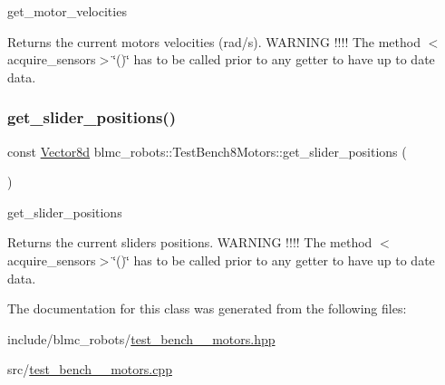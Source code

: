 get\+\_\+motor\+\_\+velocities 

\begin{DoxyReturn}{Returns}
the current motors velocities (rad/s). W\+A\+R\+N\+I\+NG !!!! The method $<$acquire\+\_\+sensors$>$\char`\"{}()\char`\"{} has to be called prior to any getter to have up to date data. 
\end{DoxyReturn}
\mbox{\label{classblmc__robots_1_1TestBench8Motors_a11bdbb6f0e4dd0824075ba309f69ad3a}} 
\subsubsection{\texorpdfstring{get\+\_\+slider\+\_\+positions()}{get\_slider\_positions()}}
{\footnotesize\ttfamily const \hyperlink{common__header_8hpp_a98975ffbe0bca1296078e0350dfedd60}{Vector8d} blmc\+\_\+robots\+::\+Test\+Bench8\+Motors\+::get\+\_\+slider\+\_\+positions (\begin{DoxyParamCaption}{ }\end{DoxyParamCaption})\hspace{0.3cm}{\ttfamily [inline]}}



get\+\_\+slider\+\_\+positions 

\begin{DoxyReturn}{Returns}
the current sliders positions. W\+A\+R\+N\+I\+NG !!!! The method $<$acquire\+\_\+sensors$>$\char`\"{}()\char`\"{} has to be called prior to any getter to have up to date data. 
\end{DoxyReturn}


The documentation for this class was generated from the following files\+:\begin{DoxyCompactItemize}
\item 
include/blmc\+\_\+robots/\hyperlink{test__bench__8__motors_8hpp}{test\+\_\+bench\+\_\+\_\+motors.\+hpp}\item 
src/\hyperlink{test__bench__8__motors_8cpp}{test\+\_\+bench\+\_\+\_\+motors.\+cpp}\end{DoxyCompactItemize}
